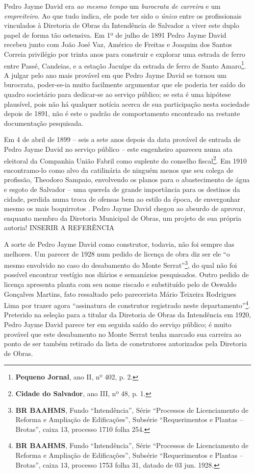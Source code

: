 Pedro Jayme David era \textit{ao mesmo tempo} um \textit{burocrata de carreira} e um \textit{empreiteiro}. Ao que tudo indica, ele pode ter sido o \textit{único} entre os profissionais vinculados à Diretoria de Obras da Intendência de Salvador a viver este duplo papel de forma tão ostensiva. Em 1º de julho de 1891 Pedro Jayme David recebeu junto com João José Vaz, Américo de Freitas e Joaquim dos Santos Correia privilégio por trinta anos para construir e explorar uma estrada de ferro entre Passé, Candeias, e a estação Jacuípe da estrada de ferro de Santo Amaro\footnote{\textbf{Pequeno Jornal}, ano II, nº 402, p. 2.}. A julgar pelo ano mais provável em que Pedro Jayme David se tornou um burocrata, poder-se-ia muito facilmente argumentar que ele poderia ter saído do quadro societário para dedicar-se ao serviço público; se esta é uma hipótese plausível, pois não há qualquer notícia acerca de sua participação nesta sociedade depois de 1891, não é este o padrão de comportamento encontrado na restante documentação pesquisada. 

Em 4 de abril de 1899 -- seis a sete anos depois da data provável de entrada de Pedro Jayme David no serviço público -- este engenheiro apareceu numa ata eleitoral da Companhia União Fabril como suplente do conselho fiscal\footnote{\textbf{Cidade do Salvador}, ano III, nº 48, p. 1.}. Em 1910 encontramo-lo como alvo da catilinária de ninguém menos que seu colega de profissão, Theodoro Sampaio, envolvendo os planos para o abastecimento de água e esgoto de Salvador – uma querela de grande importância para os destinos da cidade, perdida numa troca de ofensas bem ao estilo da época, de envergonhar mesmo os mais boquirrotos \cite{sampaio_agua_1910}. Pedro
Jayme David chegou ao absurdo de aprovar, enquanto membro da Diretoria Municipal de Obras, um projeto de sua própria autoria! INSERIR A REFERÊNCIA

A sorte de Pedro Jayme David como construtor, todavia, não foi sempre das melhores. Um parecer de 1928 num pedido de licença de obra diz ser ele ``o mesmo envolvido no caso do desabamento do Monte Serrat''\footnote{\textbf{BR BAAHMS}, Fundo ``Intendência'', Série ``Processos de Licenciamento de Reforma e Ampliação de Edificações'', Subsérie ``Requerimentos e Plantas – Brotas'', caixa 13, processo 1710 folha 254.}, do qual não foi possível encontrar vestígio nos diários e semanários pesquisados. Outro pedido de licença apresenta planta com seu nome riscado e substituído pelo de Oswaldo Gonçalves Martins, fato ressaltado pelo parecerista Mário Teixeira Rodrigues Lima por trazer agora ``assinatura de construtor registrado neste departamento''\footnote{\textbf{BR BAAHMS}, Fundo ``Intendência'', Série ``Processos de Licenciamento de Reforma e Ampliação de Edificações'', Subsérie ``Requerimentos e Plantas – Brotas'', caixa 13, processo 1753 folha 31, datado de 03 jun. 1928.}. Preterido na seleção para a titular da Diretoria de Obras da Intendência em 1920, Pedro Jayme David parece ter em seguida saído do serviço público; é muito provável que este desabamento no Monte Serrat tenha marcado sua carreira ao ponto de ser também retirado da lista de construtores autorizados pela Diretoria de Obras.

